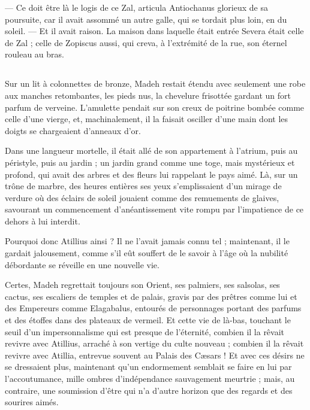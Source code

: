 \documentclass[a4paper, 11pt, oneside, polutonikogreek, french]{article}
\begin{document}
--- Ce doit être là le logis de ce Zal, articula Antiochanus glorieux de sa poursuite, car il avait assommé un autre galle, qui se tordait plus loin, en du soleil. --- Et il avait raison. La maison dans laquelle était entrée Severa était celle de Zal ; celle de Zopiscus aussi, qui creva, à l'extrémité de la rue, son éternel rouleau au bras.
\clearpage
\subsection{}
\paragraph{}
Sur un lit à colonnettes de bronze, Madeh restait étendu avec seulement une robe aux manches retombantes, les pieds nus, la chevelure frisottée gardant un fort parfum de verveine. L'amulette pendait sur son creux de poitrine bombée comme celle d'une vierge, et, machinalement, il la faisait osciller d'une main dont les doigts se chargeaient d'anneaux d'or.

Dans une langueur mortelle, il était allé de son appartement à l'atrium, puis au péristyle, puis au jardin ; un jardin grand comme une toge, mais mystérieux et profond, qui avait des arbres et des fleurs lui rappelant le pays aimé. Là, sur un trône de marbre, des heures entières ses yeux s'emplissaient d'un mirage de verdure où des éclairs de soleil jouaient comme des remuements de glaives, savourant un commencement d'anéantissement vite rompu par l'impatience de ce dehors à lui interdit.

Pourquoi donc Atillius ainsi ? Il ne l'avait jamais connu tel ; maintenant, il le gardait jalousement, comme s'il eût souffert de le savoir à l'âge où la nubilité débordante se réveille en une nouvelle vie.

Certes, Madeh regrettait toujours son Orient, ses palmiers, ses salsolas, ses cactus, ses escaliers de temples et de palais, gravis par des prêtres comme lui et des Empereurs comme Elagabalus, entourés de personnages portant des parfums et des étoffes dans des plateaux de vermeil. Et cette vie de là-bas, touchant le seuil d'un impersonnalisme qui est presque de l'éternité, combien il la rêvait revivre avec Atillius, arraché à son vertige du culte nouveau ; combien il la rêvait revivre avec Atillia, entrevue souvent au Palais des Cæsars ! Et avec ces désirs ne se dressaient plus, maintenant qu'un endormement semblait se faire en lui par l'accoutumance, mille ombres d'indépendance sauvagement meurtrie ; mais, au contraire, une soumission d'être qui n'a d'autre horizon que des regards et des sourires aimés.
\end{document}
